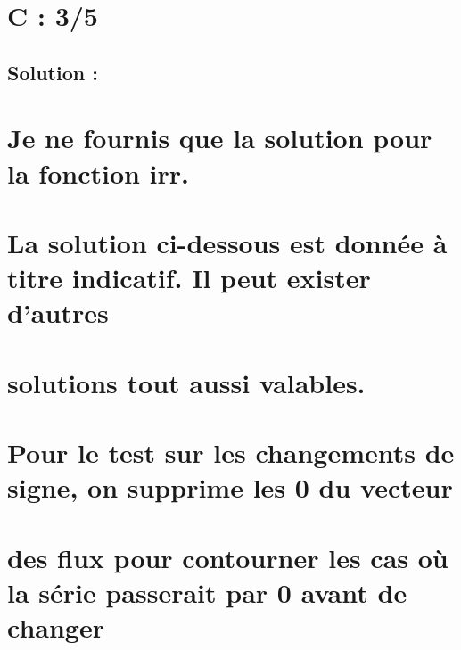 \documentclass[]{article}
\begin{document}
\hypertarget{c-35}{%
\section{C : 3/5}\label{c-35}}

\hypertarget{solution}{%
\subsection{Solution :}\label{solution}}

\hypertarget{je-ne-fournis-que-la-solution-pour-la-fonction-irr.}{%
\section{Je ne fournis que la solution pour la fonction
irr.}\label{je-ne-fournis-que-la-solution-pour-la-fonction-irr.}}

\hypertarget{la-solution-ci-dessous-est-donnuxe9e-uxe0-titre-indicatif.-il-peut-exister-dautres}{%
\section{La solution ci-dessous est donnée à titre indicatif. Il peut
exister
d'autres}\label{la-solution-ci-dessous-est-donnuxe9e-uxe0-titre-indicatif.-il-peut-exister-dautres}}

\hypertarget{solutions-tout-aussi-valables.}{%
\section{solutions tout aussi
valables.}\label{solutions-tout-aussi-valables.}}

\hypertarget{section-1}{%
\section{}\label{section-1}}

\hypertarget{pour-le-test-sur-les-changements-de-signe-on-supprime-les-0-du-vecteur}{%
\section{Pour le test sur les changements de signe, on supprime les 0 du
vecteur}\label{pour-le-test-sur-les-changements-de-signe-on-supprime-les-0-du-vecteur}}

\hypertarget{des-flux-pour-contourner-les-cas-ouxf9-la-suxe9rie-passerait-par-0-avant-de-changer}{%
\section{des flux pour contourner les cas où la série passerait par 0
avant de
changer}\label{des-flux-pour-contourner-les-cas-ouxf9-la-suxe9rie-passerait-par-0-avant-de-changer}}
\end{document}

